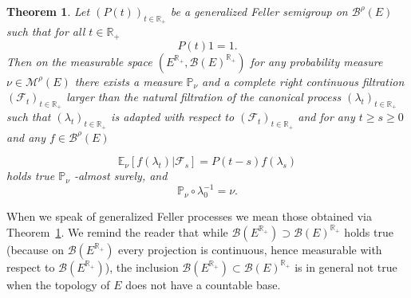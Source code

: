 \documentclass[a4paper,12pt]{article}
\newtheorem{theorem}{Theorem}[section]
\theoremstyle{definition}
\theoremstyle{remark}
\numberwithin{equation}{section}
\numberwithin{theorem}{section}
\begin{document}
\begin{theorem}
\label{thm:GFS induce Markov process}Let $\left(P(t)\right)_{t\in\mathbb{R}_{+}}$
be a generalized Feller semigroup on $\mathcal{\mathscr{B}}^{\rho}(E)$
such that for all $t\in\mathbb{R}_{+}$
\[
P(t)1=1.
\]
Then on the measurable space
$
(E^{\mathbb{R}_{+}},\mathcal{B}(E)^{\mathbb{R}_{+}})
$ 
for any probability measure  $\nu\in\mathcal{M}^{\rho}(E)$ there exists a measure $\mathbb{P}_{\nu}$
and a complete right continuous filtration $\left(\mathcal{F}_{t}\right)_{t\in\mathbb{R}_{+}}$ larger than the natural filtration of the canonical process $\left(\lambda_{t}\right)_{t\in\mathbb{R}_{+}}$
such that $\left(\lambda_{t}\right)_{t\in\mathbb{R}_{+}}$ is adapted with respect to $\left(\mathcal{F}_{t}\right)_{t\in\mathbb{R}_{+}}$ and for any $t\geq s\geq0$ and any $f\in\mathcal{\mathscr{B}}^{\rho}(E)$
 

\begin{equation} \label{eq:equation of GFS yields Markov process}
\mathbb{E}_{\nu}\left[\left.f(\lambda_{t})\right|\mathcal{F}_{s}\right]=P\left(t-s\right)f(\lambda_{s})
\end{equation}
holds true $\mathbb{P}_{\nu}$ -almost surely, and 
\[
\mathbb{\mathbb{P}}_{\nu}\circ\lambda_{0}^{-1}=\nu.
\]
\end{theorem}
 



When we speak of generalized Feller processes we mean those
obtained via Theorem~\ref{thm:GFS induce Markov process}. 
We remind the reader that while $\mathcal{B}(E^{\mathbb{R}_{+}})\supset\mathcal{B}(E)^{\mathbb{R}_{+}}$
holds true (because on $\mathcal{B}(E^{\mathbb{R}_{+}})$ every projection
is continuous, hence measurable with respect to $\mathcal{B}(E^{\mathbb{R}_{+}})$),
the inclusion $\mathcal{B}(E^{\mathbb{R}_{+}})\subset\mathcal{B}(E)^{\mathbb{R}_{+}}$
is in general not true when the topology of $E$ does not have a countable
base. 
\end{document}
